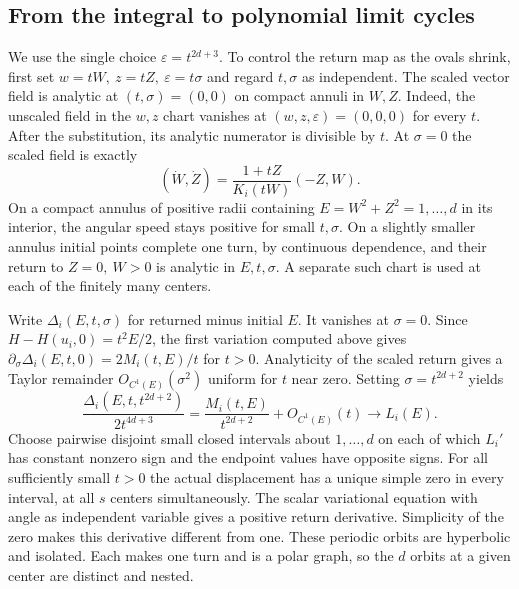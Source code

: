 \subsection{From the integral to polynomial limit cycles}

We use the single choice \(\varepsilon=t^{2d+3}\). To control the return
map as the ovals shrink, first set \(w=tW,\ z=tZ,\ \varepsilon=t\sigma\)
and regard \(t,\sigma\) as independent. The scaled vector field is
analytic at \((t,\sigma)=(0,0)\) on compact annuli in \(W,Z\).
Indeed, the unscaled field in the \(w,z\) chart vanishes at
\((w,z,\varepsilon)=(0,0,0)\) for every \(t\). After the substitution,
its analytic numerator is divisible by \(t\). At \(\sigma=0\) the
scaled field is exactly
\[
 (\dot W,\dot Z)=\frac{1+tZ}{K_i(tW)}(-Z,W).
\]
On a compact annulus of positive radii containing \(E=W^2+Z^2=1,\ldots,d\)
in its interior, the angular speed stays positive for small \(t,\sigma\).
On a slightly smaller annulus initial points complete one turn, by
continuous dependence, and their return to \(Z=0,\ W>0\) is analytic in
\(E,t,\sigma\). A separate such chart is used at each of the finitely
many centers.

Write \(\Delta_i(E,t,\sigma)\) for returned minus initial \(E\).
It vanishes at \(\sigma=0\). Since \(H-H(u_i,0)=t^2E/2\),
the first variation computed above gives
\(\partial_\sigma\Delta_i(E,t,0)=2M_i(t,E)/t\) for \(t>0\).
Analyticity of the scaled return gives a Taylor remainder
\(O_{C^1(E)}(\sigma^2)\) uniform for \(t\) near zero. Setting
\(\sigma=t^{2d+2}\) yields
\begin{equation}
 \frac{\Delta_i(E,t,t^{2d+2})}{2t^{4d+3}}
     =\frac{M_i(t,E)}{t^{2d+2}}+O_{C^1(E)}(t)
     \longrightarrow L_i(E).                         \label{cl:eq:return}
\end{equation}
Choose pairwise disjoint small closed intervals about \(1,\ldots,d\)
on each of which \(L_i'\) has constant nonzero sign and the endpoint
values have opposite signs. For all sufficiently small \(t>0\) the
actual displacement has a unique simple zero in every interval, at all
\(s\) centers simultaneously. The scalar variational equation with angle
as independent variable gives a positive return derivative. Simplicity
of the zero makes this derivative different from one. These periodic
orbits are hyperbolic and isolated.
Each makes one turn and is a polar graph, so the \(d\) orbits at a given
center are distinct and nested.

